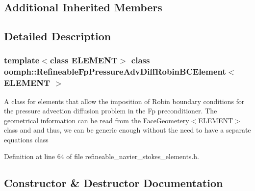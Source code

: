\subsection*{Additional Inherited Members}


\subsection{Detailed Description}
\subsubsection*{template$<$class E\+L\+E\+M\+E\+NT$>$\newline
class oomph\+::\+Refineable\+Fp\+Pressure\+Adv\+Diff\+Robin\+B\+C\+Element$<$ E\+L\+E\+M\+E\+N\+T $>$}

A class for elements that allow the imposition of Robin boundary conditions for the pressure advection diffusion problem in the Fp preconditioner. The geometrical information can be read from the Face\+Geometery$<$\+E\+L\+E\+M\+E\+N\+T$>$ class and and thus, we can be generic enough without the need to have a separate equations class 

Definition at line 64 of file refineable\+\_\+navier\+\_\+stokes\+\_\+elements.\+h.



\subsection{Constructor \& Destructor Documentation}
\mbox{\label{classoomph_1_1RefineableFpPressureAdvDiffRobinBCElement_a7e0807edbc6be7c59b82210c091c5daa}} 
